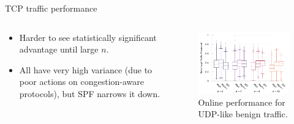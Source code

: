 \documentclass[aspectratio=169,xcolor={dvipsnames}
,hide notes
]{beamer}
\begin{document}
\begin{frame}{TCP traffic performance}
\begin{columns}
	\begin{column}{0.3\linewidth}
		\begin{itemize}
			\item Harder to see statistically significant advantage until large $n$.
			\item All have very high variance (due to poor actions on congestion-aware protocols), but SPF narrows it down.
		\end{itemize}
	\end{column}
	\begin{column}{0.7\linewidth}
		\begin{figure}
			\centering
			\includegraphics[width=0.95\linewidth]{../plots/tcp-box-pres}
			
			\caption{
				Online performance for UDP-like benign traffic.
				\label{fig:tcp-box}
			}
		\end{figure}
	\end{column}
\end{columns}
\end{frame}
\end{document}
